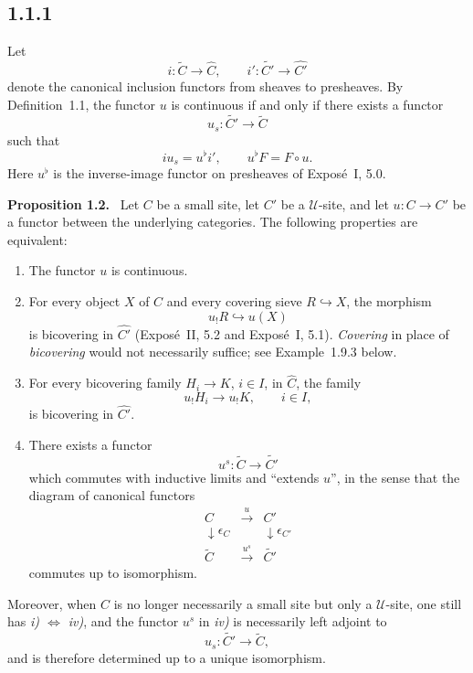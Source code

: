 \documentclass[11pt]{article}
\newcommand{\U}{\mathcal{U}}
\newenvironment{statement}[1]{\par\medskip\noindent\textbf{#1.}\ }{\par\medskip}
\begin{document}
\subsection*{1.1.1}
Let
\[
i:\widetilde C\to \widehat C,
\qquad
 i':\widetilde{C'}\to \widehat{C'}
\]
denote the canonical inclusion functors from sheaves to presheaves. By Definition~1.1, the functor \(u\) is continuous if and only if there exists a functor
\[
u_s:\widetilde{C'}\to\widetilde C
\]
such that
\[
i u_s=u^\flat i',\qquad u^\flat F=F\circ u.
\]
Here \(u^\flat\) is the inverse-image functor on presheaves of Expos\'e~I, 5.0.

\begin{statement}{Proposition 1.2}
Let \(C\) be a small site, let \(C'\) be a \(\U\)-site, and let \(u:C\to C'\) be a functor between the underlying categories. The following properties are equivalent:
\begin{enumerate}[label=\roman*)]
\item The functor \(u\) is continuous.
\item For every object \(X\) of \(C\) and every covering sieve \(R\hookrightarrow X\), the morphism
\[
u_!R\hookrightarrow u(X)
\]
is bicov\-ering in \(\widehat{C'}\) (Expos\'e~II, 5.2 and Expos\'e~I, 5.1). \emph{Covering} in place of \emph{bicov\-ering} would not necessarily suffice; see Example~1.9.3 below.
\item For every bicov\-ering family \(H_i\to K\), \(i\in I\), in \(\widehat C\), the family
\[
u_!H_i\to u_!K,
\qquad i\in I,
\]
is bicov\-ering in \(\widehat{C'}\).
\item There exists a functor
\[
u^s:\widetilde C\to\widetilde{C'}
\]
which commutes with inductive limits and ``extends \(u\)'', in the sense that the diagram of canonical functors
\[
\begin{array}{ccc}
C&\xrightarrow{u}&C'\\
\downarrow \epsilon_C&&\downarrow\epsilon_{C'}\\
\widetilde C&\xrightarrow{u^s}&\widetilde{C'}
\end{array}
\]
commutes up to isomorphism.
\end{enumerate}
Moreover, when \(C\) is no longer necessarily a small site but only a \(\U\)-site, one still has \emph{i) \(\Leftrightarrow\) iv)}, and the functor \(u^s\) in \emph{iv)} is necessarily left adjoint to
\[
u_s:\widetilde{C'}\to\widetilde C,
\]
and is therefore determined up to a unique isomorphism.
\end{statement}
\end{document}
